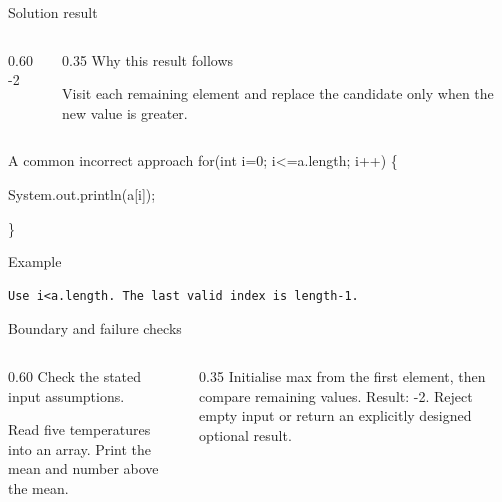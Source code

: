 \documentclass[10pt,aspectratio=169]{beamer}
\begin{document}
\begin{frame}[fragile,t]{Solution result}
\begin{columns}[T,onlytextwidth]\begin{column}{0.60\textwidth}
-2
\end{column}\begin{column}{0.35\textwidth}\small
Why this result follows

Visit each remaining element and replace the candidate only when the new value is greater.
\end{column}\end{columns}
\end{frame}

\begin{frame}[fragile,t]{A common incorrect approach}
for(int i=0; i\textless{}=a.length; i++) \{\par   System.out.println(a[i]);\par \}
\vspace{1mm}\begin{block}{Example}
\begin{lstlisting}
Use i<a.length. The last valid index is length-1.
\end{lstlisting}
\end{block}
\end{frame}

\begin{frame}[fragile,t]{Boundary and failure checks}
\begin{columns}[T,onlytextwidth]\begin{column}{0.60\textwidth}
Check the stated input assumptions.

Read five temperatures into an array. Print the mean and number above the mean.
\end{column}\begin{column}{0.35\textwidth}\small
Initialise max from the first element, then compare remaining values. Result: -2. Reject empty input or return an explicitly designed optional result.
\end{column}\end{columns}
\end{frame}
\end{document}
